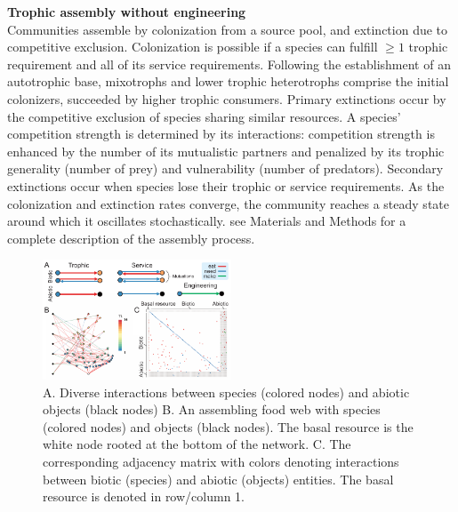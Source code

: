 \documentclass[9pt,twocolumn,twoside]{pnas-new}
\begin{document}
\noindent \textbf{Trophic assembly without engineering} \\
\noindent Communities assemble by colonization from a source pool, and extinction due to competitive exclusion. 
Colonization is possible if a species can fulfill $\geq 1$ trophic requirement and all of its service requirements.
Following the establishment of an autotrophic base, mixotrophs and lower trophic heterotrophs comprise the initial colonizers, succeeded by higher trophic consumers.
Primary extinctions occur by the competitive exclusion of species sharing similar resources.
A species' competition strength is determined by its interactions: competition strength is enhanced by the number of its mutualistic partners and penalized by its trophic generality (number of prey) and vulnerability (number of predators).
Secondary extinctions occur when species lose their trophic or service requirements.
As the colonization and extinction rates converge, the community reaches a steady state around which it oscillates stochastically.
see Materials and Methods for a complete description of the assembly process. %


\begin{figure}
\centering
\includegraphics[width=0.5\textwidth]{fig_model.pdf}
\caption{
A. Diverse interactions between species (colored nodes) and abiotic objects (black nodes)
B. An assembling food web with species (colored nodes) and objects (black nodes). The basal resource is the white node rooted at the bottom of the network.
C. The corresponding adjacency matrix with colors denoting interactions between biotic (species) and abiotic (objects) entities. The basal resource is denoted in row/column 1. 
}
\label{fig:model}
\end{figure}
\end{document}
